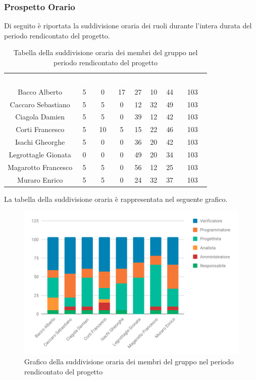 \subsubsection{Prospetto Orario}
Di seguito è riportata la suddivisione oraria dei ruoli durante l'intera durata del periodo rendicontato del progetto.


\begin{table}[H]	
	\begin{center}
	    \begin{tabular}{cccccccc}
			\rowcolor{greySWEight}
			\textcolor{white}{\textbf{Nome}} & \textcolor{white}{\textbf{Re}} & \textcolor{white}{\textbf{Am}} & \textcolor{white}{\textbf{An}} & \textcolor{white}{\textbf{Pj}} & \textcolor{white}{\textbf{Pr}} & \textcolor{white}{\textbf{Ve}} & \textcolor{white}{\textbf{Totale}}
			\\			

			Bacco Alberto & 5 & 0 & 17 & 27 & 10 & 44 & 103 \\
			Caccaro Sebastiano & 5 & 5 & 0 & 12 & 32 & 49 & 103 \\
			Ciagola Damien & 5 & 5 & 0 & 39 & 12 & 42 & 103 \\
			Corti Francesco & 5 & 10 & 5 & 15 & 22 & 46 & 103 \\
			Isachi Gheorghe & 5 & 0 & 0 & 36 & 20 & 42 & 103 \\
			Legrottagle Gionata & 0 & 0 & 0 & 49 & 20 & 34 & 103 \\
			Magarotto Francesco & 5 & 5 & 0 & 56 & 12 & 25 & 103 \\
			Muraro Enrico & 5 & 5 & 0 & 24 & 32 & 37 & 103 \\
			\end{tabular}
	    \caption{Tabella della suddivisione oraria dei membri del gruppo nel periodo rendicontato del progetto} \label{tab:tabellaPersoneTotale} 
	\end{center}
\end{table}

La tabella della suddivisione oraria è rappresentata nel seguente grafico.
\begin{figure}[H]
	\includegraphics[width=1\linewidth]{Preventivo/grafici/TR1.pdf}
	\caption{Grafico della suddivisione oraria dei membri del gruppo nel periodo rendicontato del progetto}
\end{figure}

